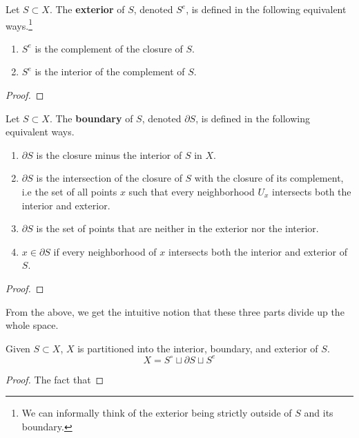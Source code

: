   \begin{definition}[Exteriors]
    \label{def:exteriors}
    Let $S \subset X$. The \textbf{exterior} of $S$, denoted $S^e$, is defined in the following equivalent ways.\footnote{We can informally think of the exterior being strictly outside of $S$ and its boundary.}
    \begin{enumerate}
      \item $S^e$ is the complement of the closure of $S$. 
      \item $S^e$ is the interior of the complement of $S$. 
    \end{enumerate}
  \end{definition}
  \begin{proof}
    
  \end{proof}

  \begin{definition}[Boundary]
    \label{def:boundary}
    Let $S \subset X$. The \textbf{boundary} of $S$, denoted $\partial S$, is defined in the following equivalent ways. 
    \begin{enumerate}
      \item $\partial S$ is the closure minus the interior of $S$ in $X$. 
      \item $\partial S$ is the intersection of the closure of $S$ with the closure of its complement, i.e the set of all points $x$ such that every neighborhood $U_x$ intersects both the interior and exterior. 
      \item $\partial S$ is the set of points that are neither in the exterior nor the interior. 
      \item $x \in \partial S$ if every neighborhood of $x$ intersects both the interior and exterior of $S$. 
    \end{enumerate}
  \end{definition}
  \begin{proof}
    
  \end{proof}

  From the above, we get the intuitive notion that these three parts divide up the whole space. 

  \begin{theorem}
    \label{thm:partitioning-of-space}
    Given $S \subset X$, $X$ is partitioned into the interior, boundary, and exterior of $S$. 
    \begin{equation}
      X = S^\circ \sqcup \partial S \sqcup S^e
    \end{equation}
  \end{theorem}
  \begin{proof}
    The fact that 
  \end{proof}

